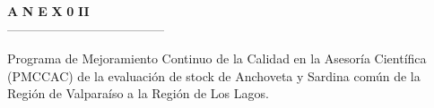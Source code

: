 \documentclass[12pt, oneside]{article} %
\begin{document}

\begingroup
\begin{titlepage}
   \normalsize
\vspace*{7cm} 

\noindent


 \begin{flushright}
 \fontsize{35pt}{35pt}\selectfont 	
 \uppercase\expandafter{}  \textbf{A} \hspace{0.2pt} \textbf{N}  \hspace{0.2pt} \textbf{E} \hspace{0.2pt}  \textbf{X} \hspace{0.2pt}   \textbf{0} \hspace{8.5pt}    \textbf{II}  \\
 \vspace*{-0.5cm} 
 --------------------------------------\\
\end{flushright} 

\vspace*{-1.5cm} 

 \begin{flushright}
  \fontsize{14pt}{14pt}\selectfont 
 Programa de Mejoramiento Continuo de la Calidad en la Asesoría Científica (PMCCAC) de la evaluación de stock de Anchoveta y Sardina común de la Región de Valparaíso a la Región de Los Lagos.
 \end{flushright} 
      
\end{titlepage}
\endgroup
\end{document}
